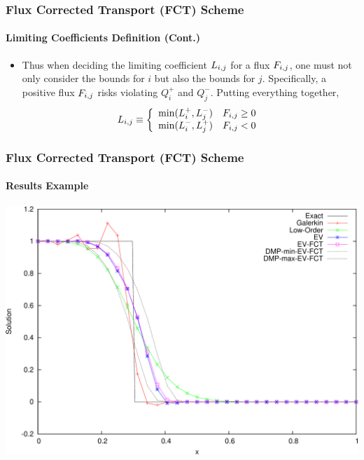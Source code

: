 \documentclass{beamer}
\begin{document}
\begin{frame}
\frametitle{Flux Corrected Transport (FCT) Scheme}
\framesubtitle{Limiting Coefficients Definition (Cont.)}

\begin{itemize}
   \item Thus when deciding the limiting coefficient $L_{i,j}$ for a flux $F_{i,j}$, 
      one must not only consider the bounds for $i$ but also the bounds for $j$.
      Specifically, a positive flux $F_{i,j}$ risks violating $Q_i^+$ and $Q_j^-$.
      Putting everything together,
      \begin{equation}
         L_{i,j} \equiv\left\{
            \begin{array}{l l}
               \min(L_i^+,L_j^-) & F_{i,j} \geq 0\\
               \min(L_i^-,L_j^+) & F_{i,j} < 0
            \end{array}
            \right.
      \end{equation}
\end{itemize}

\end{frame}
\begin{frame}
\frametitle{Flux Corrected Transport (FCT) Scheme}
\framesubtitle{Results Example}

\includegraphics[width=\textwidth]{./figures/advection_FCT.pdf}

\end{frame}
\end{document}
